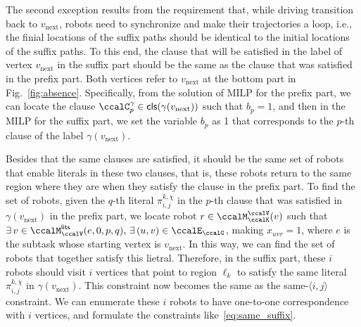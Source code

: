 \documentclass[Afour,sageh,times]{sagej}
\newcommand{\clause}[1]{\mathsf{cls}(#1)}
\newcommand{\auto}[1]{\ccalA_{\text{#1}}}
\newcommand{\ag}[2]{\langle#1,#2\rangle}
\renewcommand{\ap}[3]{\mathcal{\pi}_{{#1},{#2}}^{#3}}
\begin{document}
{%


  The second exception results from the requirement that, while driving transition back to $v_{\text{next}}$, robots need to synchronize and make their trajectories a loop, i.e., the finial locations of the suffix paths should be identical to the initial locations of the suffix paths. To this end, the clause that will be satisfied in the label of vertex $v_{\text{next}}$ in the suffix part should be the same as the clause that was satisfied in the prefix part. Both vertices refer to $v_{\text{next}}$ at the bottom part in Fig.~\ref{fig:absence}. Specifically, from the solution of MILP for the prefix part, we can locate the clause $\ccalC_p^\gamma \in \clause{\gamma(v_{\text{next}})}$ such that  $b_p = 1$, and then in the MILP for the suffix part, we set the variable $b_p$ as 1 that corresponds to the $p$-th clause of the label $\gamma(v_{\text{next}})$.

  Besides that the same clauses are satisfied, it should be the same set of robots that enable literals in these two clauses, that is, these robots return to the same region where they are when they satisfy the clause in the prefix part. To find the set of robots, given
  the $q$-th literal $\ap{i}{j}{k,\chi}$ in the $p$-th clause that was satisfied in $\gamma(v_{\text{next}})$ in the prefix part,  we locate robot $r\in \ccalM_\ccalK^\ccalV(v)$ such that $\exists\, v\in \ccalM_{\ccalV}^\mathsf{lits} (e, 0, p, q),\,\exists\, (u,v)\in\ccalE_\ccalG$, making $x_{uvr}=1$, where $e$ is the subtask whose starting vertex is $v_{\text{next}}$. In this way, we can find the set of robots that together satisfy this lietral. Therefore, in the suffix part, these $i$ robots should visit $i$ vertices that  point to region $\ell_k$ to satisfy the same literal $\ap{i}{j}{k,\chi}$ in $\gamma(v_{\text{next}})$. This constraint now becomes the same as the same-$\ag{i}{j}$ constraint. We can enumerate these $i$ robots to have one-to-one correspondence with $i$ vertices, and formulate the constraints like~\eqref{eq:same_suffix}.

}
\end{document}
